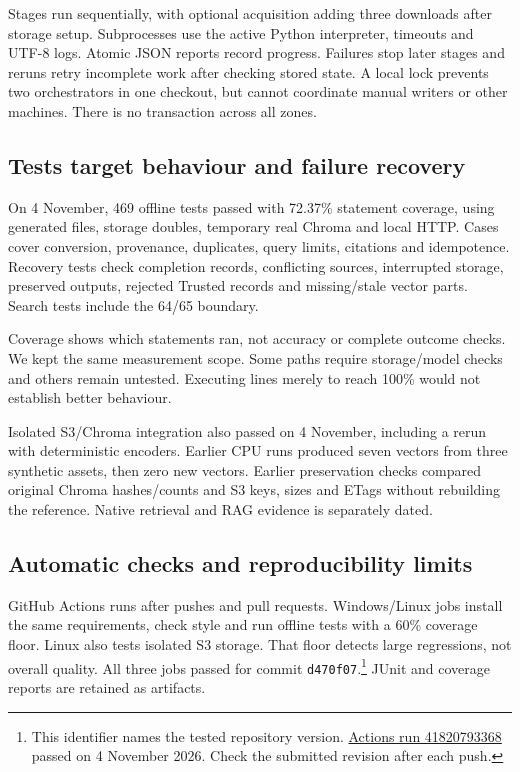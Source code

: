 \documentclass[10pt,a4paper]{article}
\begin{document}
Stages run sequentially, with optional acquisition adding three downloads after storage setup. Subprocesses use the active Python interpreter, timeouts and UTF-8 logs. Atomic JSON reports record progress. Failures stop later stages and reruns retry incomplete work after checking stored state. A local lock prevents two orchestrators in one checkout, but cannot coordinate manual writers or other machines. There is no transaction across all zones.

\subsection*{Tests target behaviour and failure recovery}
On 4 November, 469 offline tests passed with 72.37\% statement coverage, using generated files, storage doubles, temporary real Chroma and local HTTP. Cases cover conversion, provenance, duplicates, query limits, citations and idempotence. Recovery tests check completion records, conflicting sources, interrupted storage, preserved outputs, rejected Trusted records and missing/stale vector parts. Search tests include the 64/65 boundary.

Coverage shows which statements ran, not accuracy or complete outcome checks. We kept the same measurement scope. Some paths require storage/model checks and others remain untested. Executing lines merely to reach 100\% would not establish better behaviour.

Isolated S3/Chroma integration also passed on 4 November, including a rerun with deterministic encoders. Earlier CPU runs produced seven vectors from three synthetic assets, then zero new vectors. Earlier preservation checks compared original Chroma hashes/counts and S3 keys, sizes and ETags without rebuilding the reference. Native retrieval and RAG evidence is separately dated.

\subsection*{Automatic checks and reproducibility limits}
GitHub Actions runs after pushes and pull requests. Windows/Linux jobs install the same requirements, check style and run offline tests with a 60\% coverage floor. Linux also tests isolated S3 storage. That floor detects large regressions, not overall quality. All three jobs passed for commit \texttt{d470f07}.\footnote{This identifier names the tested repository version. \href{https://github.com/SambhavMayani/ADSBDB/actions/runs/41820793368}{Actions run 41820793368} passed on 4 November 2026. Check the submitted revision after each push.} JUnit and coverage reports are retained as artifacts.
\end{document}

